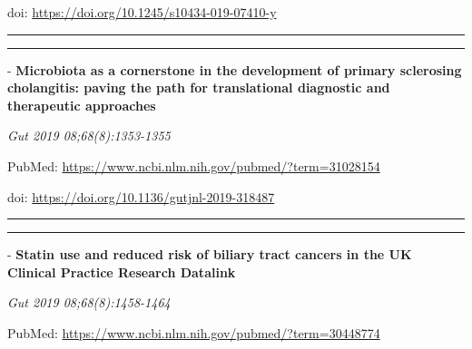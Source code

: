 \documentclass[]{article}
\begin{document}
doi: \url{https://doi.org/10.1245/s10434-019-07410-y}

{}

{}

\begin{center}\rule{0.5\linewidth}{\linethickness}\end{center}

\begin{center}\rule{0.5\linewidth}{\linethickness}\end{center}

 - \textbf{Microbiota as a cornerstone in the development of primary
sclerosing cholangitis: paving the path for translational diagnostic and
therapeutic approaches}

\emph{Gut 2019 08;68(8):1353-1355}

PubMed: \url{https://www.ncbi.nlm.nih.gov/pubmed/?term=31028154}

doi: \url{https://doi.org/10.1136/gutjnl-2019-318487}

{}

{}

\begin{center}\rule{0.5\linewidth}{\linethickness}\end{center}

\begin{center}\rule{0.5\linewidth}{\linethickness}\end{center}

 - \textbf{Statin use and reduced risk of biliary tract cancers in the
UK Clinical Practice Research Datalink}

\emph{Gut 2019 08;68(8):1458-1464}

PubMed: \url{https://www.ncbi.nlm.nih.gov/pubmed/?term=30448774}
\end{document}
